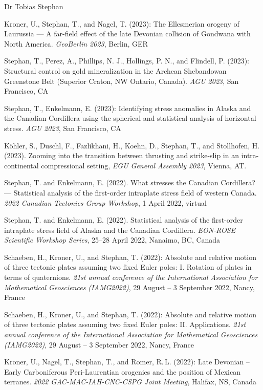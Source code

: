 \documentclass[10pt, paper=letter]{scrartcl} %
\begin{document}
\begin{cv}{\textcolor{myred}{\textsf{Dr Tobias Stephan}}}
\begin{cvlist}{}
        \item[28] Kroner, U., Stephan, T., and Nagel, T. (2023): The Ellesmerian orogeny of Laurussia --- A far-field effect of the late Devonian collision of Gondwana with North America. \textit{GeoBerlin 2023}, Berlin, GER
        \item[27] Stephan, T., Perez, A., Phillips, N. J., Hollings, P. N., and Flindell, P. (2023): Structural control on gold mineralization in the Archean Shebandowan Greenstone Belt (Superior Craton, NW Ontario, Canada). \textit{AGU 2023}, San Francisco, CA
        \item[26] Stephan, T., Enkelmann, E. (2023): Identifying stress anomalies in Alaska and the Canadian Cordillera using the spherical and statistical analysis of horizontal stress. \textit{AGU 2023}, San Francisco, CA
        \item[24] K\"ohler, S., Duschl, F., Fazlikhani, H., Koehn, D., Stephan, T., and Stollhofen, H. (2023).  Zooming into the transition between thrusting and strike-slip in an intra-continental compressional setting, \textit{EGU General Assembly 2023}, Vienna, AT. 

        \item[23] Stephan, T. and Enkelmann, E. (2022). What stresses the Canadian Cordillera? --- Statistical analysis of the first-order intraplate stress field of western Canada. \textit{2022 Canadian Tectonics Group Workshop}, 1 April 2022, virtual
        \item[22] Stephan, T. and Enkelmann, E. (2022). Statistical analysis of the first-order intraplate stress field of Alaska and the Canadian Cordillera. \textit{EON-ROSE Scientific Workshop Series}, 25--28 April 2022, Nanaimo, BC, Canada
        \item[21] Schaeben, H., Kroner, U., and Stephan, T. (2022): Absolute and relative motion of three tectonic plates assuming two fixed Euler poles: I. Rotation of plates in terms of quaternions. \textit{21st annual conference of the International Association for Mathematical Geosciences (IAMG2022)}, 29 August -- 3 September 2022, Nancy, France
        \item[20] Schaeben, H., Kroner, U., and Stephan, T. (2022): Absolute and relative motion of three tectonic plates assuming two fixed Euler poles: II. Applications. \textit{21st annual conference of the International Association for Mathematical Geosciences (IAMG2022)}, 29 August -- 3 September 2022, Nancy, France
        \item[19] Kroner, U., Nagel, T., Stephan, T., and Romer, R.\,L. (2022): Late Devonian -- Early Carboniferous Peri-Laurentian orogenies and the position of Mexican terranes. \textit{2022 GAC-MAC-IAH-CNC-CSPG Joint Meeting}, Halifax, NS, Canada


\end{cvlist}
\end{cv}
\end{document}
